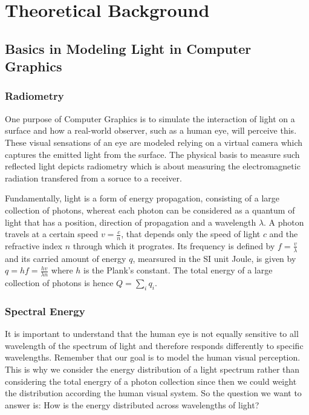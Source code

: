 \chapter{Theoretical Background}
\section{Basics in Modeling Light in Computer Graphics}

\subsection{Radiometry}
One purpose of Computer Graphics is to simulate the interaction of light on a surface and how a real-world observer, such as a human eye, will perceive this. These visual sensations of an eye are modeled relying on a virtual camera which captures the emitted light from the surface. The physical basis to measure such reflected light depicts radiometry which is about measuring the electromagnetic radiation transfered from a soruce to a receiver. 

Fundamentally, light is a form of energy propagation, consisting of a large collection of photons, whereat each photon can be considered as a quantum of light that has a position, direction of propagation and a wavelength $\lambda$. A photon travels at a certain speed $v = \frac{c}{n}$, that depends only the speed of light $c$ and the refractive index $n$ through which it progrates. Its frequency is defined by $f = \frac{v}{\lambda}$ and its carried amount of energy $q$, mearsured in the SI unit Joule, is given by $q = hf= \frac{hv}{\lambda n}$ where $h$ is the Plank's constant. The total energy of a large collection of photons is hence $Q = \sum_i q_i$.

\subsection{Spectral Energy}

It is important to understand that the human eye is not equally sensitive to all wavelength of the spectrum of light and therefore responds differently to specific wavelengths. Remember that our goal is to model the human visual perception. This is why we consider the energy distribution of a light spectrum rather than considering the total energry of a photon collection since then we could weight the distribution according the human visual system. So the question we want to answer is: How is the energy distributed across wavelengths of light?

